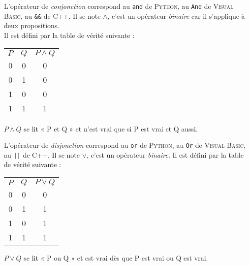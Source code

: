 \begin{definition}
	L'opérateur de \textit{conjonction} correspond au \texttt{and} de \textsc{Python}, au \texttt{And} de \textsc{Visual Basic}, au \texttt{\&\&} de \textsc{C++}.
	Il se note $\wedge$, c'est un opérateur \textit{binaire} car il s'applique à deux propositions.\\
	Il est défini par la table de vérité suivante :
	\begin{center}
		\tabstyled
		\begin{tabular}{|c|c|c|}
			\rowcolor{UGLiGreen}
			\ccell $P$ & \ccell $Q$ & \ccell $P\wedge Q$ \\
			
			
			0                  & 0                  & 0                          \\
			
			
			0                  & 1                  & 0                          \\
			
			
			1                  & 0                  & 0                          \\
			
			1                  & 1                  & 1                          \\
		\end{tabular}
	\end{center}
	$P\wedge Q$ se lit « P et Q » et n'est vrai que si P est vrai et Q aussi.
\end{definition}

\begin{definition}
	L'opérateur de \textit{disjonction} correspond au \texttt{or} de \textsc{Python}, au \texttt{Or} de \textsc{Visual Basic}, au \texttt{||} de \textsc{C++}.
	Il se note $\vee$, c'est un opérateur \textit{binaire}.	Il est défini par la table de vérité suivante :
	\begin{center}
		\tabstyled
		\begin{tabular}{|c|c|c|}
			
			\rowcolor{UGLiGreen}
			\ccell\boldmath$P$ & \ccell\boldmath$Q$ & \ccell\boldmath$P\vee Q$ \\
			
			\rowcolor{white}
			0                  & 0                  & 0                        \\
			
			\rowcolor{white}
			0                  & 1                  & 1                        \\
			
			\rowcolor{white}
			1                  & 0                  & 1                        \\
			
			1                  & 1                  & 1                        \\
		\end{tabular}
	\end{center}
	$P\vee Q$ se lit « P ou Q » et est vrai dès que P est vrai ou Q est vrai.
\end{definition}

